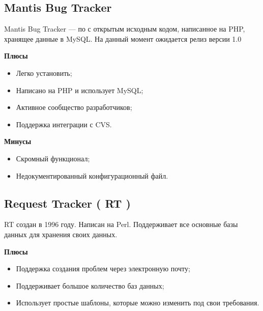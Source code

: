 \subsection{ Mantis Bug Tracker } \label{sect3_16_2}

Mantis Bug Tracker --- по с открытым исходным кодом, написанное на PHP, хранящее данные в MySQL. На данный момент ожидается релиз версии 1.0

\textbf{Плюсы}

\begin{itemize}

\item Легко установить;

\item Написано на PHP  и использует  MySQL;

\item Активное сообщество разработчиков;

\item Поддержка интеграции с CVS.

\end{itemize}


\textbf{Минусы}

\begin{itemize}

\item Скромный функционал;

\item Недокументированный конфигурационный файл.

\end{itemize}

\subsection{ Request Tracker ( RT ) } \label{sect3_16_3}

RT создан в 1996 году. Написан на Perl. Поддерживает все основные базы данных для хранения своих данных.

\textbf{Плюсы}

\begin{itemize}

\item Поддержка создания проблем через электронную почту;

\item Поддерживает большое количество баз данных;

\item Использует простые шаблоны, которые можно изменить под свои требования.

\end{itemize}

